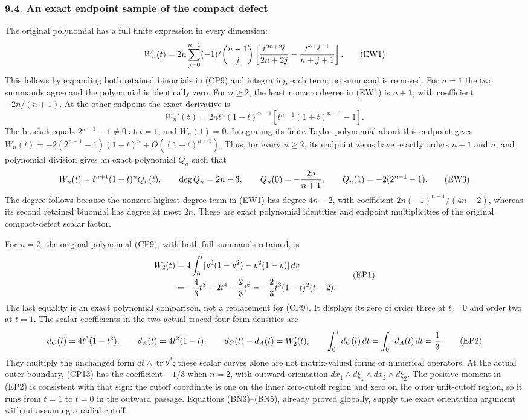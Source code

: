 \documentclass[
  11pt,
]{article}
\begin{document}
\subsubsection{9.4. An exact endpoint sample of the compact
defect}\label{an-exact-endpoint-sample-of-the-compact-defect}

The original polynomial has a full finite expression in every dimension:
\[
 W_n(t)=2n\sum_{j=0}^{n-1}(-1)^j\binom{n-1}{j}
 \left[{t^{2n+2j}\over2n+2j}
       -{t^{n+j+1}\over n+j+1}\right].
 \tag{EW1}
\] This follows by expanding both retained binomials in (CP9) and
integrating each term; no summand is removed. For \(n=1\) the two
summands agree and the polynomial is identically zero. For \(n\ge2\),
the least nonzero degree in (EW1) is \(n+1\), with coefficient
\(-2n/(n+1)\). At the other endpoint the exact derivative is \[
 W_n'(t)=2n t^n(1-t)^{n-1}
     [t^{n-1}(1+t)^{n-1}-1].
 \tag{EW2}
\] The bracket equals \(2^{n-1}-1\ne0\) at \(t=1\), and \(W_n(1)=0\).
Integrating its finite Taylor polynomial about this endpoint gives
\(W_n(t)=-2(2^{n-1}-1)(1-t)^n+O((1-t)^{n+1})\). Thus, for every
\(n\ge2\), its endpoint zeros have exactly orders \(n+1\) and \(n\), and
polynomial division gives an exact polynomial \(Q_n\) such that \[
 W_n(t)=t^{n+1}(1-t)^nQ_n(t),\qquad
 \deg Q_n=2n-3,\qquad
 Q_n(0)=-{2n\over n+1},\qquad
 Q_n(1)=-2(2^{n-1}-1).
 \tag{EW3}
\] The degree follows because the nonzero highest-degree term in (EW1)
has degree \(4n-2\), with coefficient \(2n(-1)^{n-1}/(4n-2)\), whereas
its second retained binomial has degree at most \(2n\). These are exact
polynomial identities and endpoint multiplicities of the original
compact-defect scalar factor.

For \(n=2\), the original polynomial (CP9), with both full summands
retained, is \[
 \begin{aligned}
 W_2(t)
 &=4\int_0^t[v^3(1-v^2)-v^2(1-v)]\,dv\\
 &=-{4\over3}t^3+2t^4-{2\over3}t^6
   =-{2\over3}t^3(1-t)^2(t+2).
 \end{aligned}
 \tag{EP1}
\] The last equality is an exact polynomial comparison, not a
replacement for (CP9). It displays its zero of order three at \(t=0\)
and order two at \(t=1\). The scalar coefficients in the two actual
traced four-form densities are {\small
\[
 d_C(t)=4t^3(1-t^2),\qquad
 d_A(t)=4t^2(1-t),\qquad
 d_C(t)-d_A(t)=W_2'(t),\qquad
 \int_0^1d_C(t)\,dt=\int_0^1d_A(t)\,dt={1\over3}.
 \tag{EP2}
\]
} They multiply the unchanged form
\(dt\wedge\operatorname{tr}\theta^3\); these scalar curves alone are not
matrix-valued forms or numerical operators. At the actual outer
boundary, (CP13) has the coefficient \(-1/3\) when \(n=2\), with outward
orientation \(dx_1\wedge d\xi_1\wedge dx_2\wedge d\xi_2\). The positive
moment in (EP2) is consistent with that sign: the cutoff coordinate is
one on the inner zero-cutoff region and zero on the outer unit-cutoff
region, so it runs from \(t=1\) to \(t=0\) in the outward passage.
Equations (BN3)--(BN5), already proved globally, supply the exact
orientation argument without assuming a radial cutoff.
\end{document}
